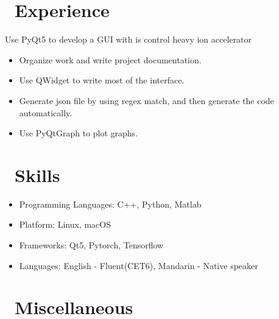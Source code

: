 \documentclass{resume}
\begin{document}
\section{\faUsers\ Experience}
Use PyQt5 to develop a GUI with is control heavy ion accelerator
\begin{itemize}
  \item Organize work and write project documentation.
  \item Use QWidget to write most of the interface.
  \item Generate json file by using regex match, and then generate the code automatically.
  \item Use PyQtGraph to plot graphs.
\end{itemize}


\section{\faCogs\ Skills}
\begin{itemize}[parsep=0.5ex]
  \item Programming Languages: C++, Python, Matlab
  \item Platform: Linux, macOS
  \item Frameworks: Qt5, Pytorch, Tensorflow
  \item Languages: English - Fluent(CET6), Mandarin - Native speaker
\end{itemize}

\section{\faInfo\ Miscellaneous}

%
%
\end{document}
